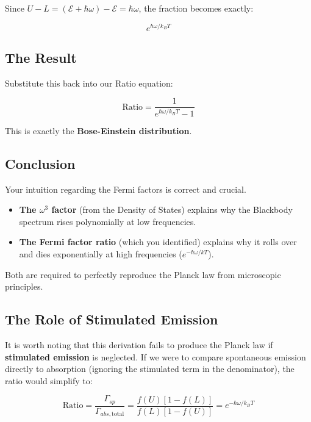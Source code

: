 Since $U - L = (\mathcal{E}+\hbar\omega) - \mathcal{E} = \hbar\omega$, the fraction becomes exactly:

\begin{equation}
e^{\hbar\omega/k_B T}
\label{eq:kirchhoff_exponential}
\end{equation}

\subsection{The Result}

Substitute this back into our Ratio equation:

\begin{equation}
\text{Ratio} = \frac{1}{e^{\hbar\omega/k_B T} - 1}
\label{eq:kirchhoff_final_ratio}
\end{equation}

This is exactly the \textbf{Bose-Einstein distribution}.

\subsection{Conclusion}

Your intuition regarding the Fermi factors is correct and crucial.

\begin{itemize}
  \item \textbf{The $\omega^3$ factor} (from the Density of States) explains why the Blackbody spectrum rises polynomially at low frequencies.
  \item \textbf{The Fermi factor ratio} (which you identified) explains why it rolls over and dies exponentially at high frequencies ($e^{-\hbar\omega/kT}$).
\end{itemize}

Both are required to perfectly reproduce the Planck law from microscopic principles.

\subsection{The Role of Stimulated Emission}

It is worth noting that this derivation fails to produce the Planck law if \textbf{stimulated emission} is neglected. If we were to compare spontaneous emission directly to absorption (ignoring the stimulated term in the denominator), the ratio would simplify to:

\begin{equation}
\text{Ratio} = \frac{\Gamma_{sp}}{\Gamma_{abs, \text{total}}} = \frac{f(U)[1-f(L)]}{f(L)[1-f(U)]} = e^{-\hbar\omega/k_B T}
\label{eq:kirchhoff_wien}
\end{equation}


